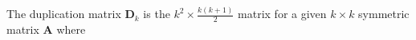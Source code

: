 The duplication matrix $\mathbf{D}_{k}$
is the $k^2 \times \frac{k \left( k + 1 \right)}{2}$ matrix
for a given $k \times k$ symmetric matrix $\mathbf{A}$
where
